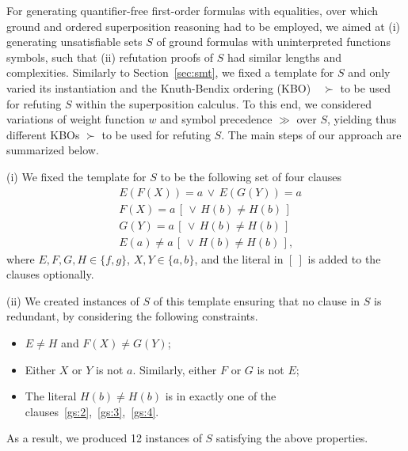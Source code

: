 For generating quantifier-free first-order formulas with equalities,
over which ground and ordered superposition reasoning had to be employed, we
aimed at (i)  generating  unsatisfiable sets $S$ of ground formulas with
uninterpreted functions symbols, such that (ii)  refutation proofs
of $S$ had similar lengths and complexities. Similarly to
Section~\ref{sec:smt}, we fixed a template for $S$  and only varied
its instantiation and
the Knuth-Bendix ordering (KBO)~\cite{Knuth1970}~$\succ$ to be used for refuting  $S$
within the superposition calculus. To this end, we considered
variations of weight function $w$ and symbol precedence $\gg$ over $S$,
yielding thus different KBOs $\succ$ to be used for refuting $S$.
The main steps of our approach are summarized below.\smallskip

\noindent(i) We fixed the template for $S$ to be the following set of four clauses
\begin{align}
  &E(F(X)) = a \,\lor\, E(G(Y)) = a \label{gs:1} \\
  &F(X) = a \,[\, \lor\, H(b) \not= H(b) \,] \label{gs:2} \\
  &G(Y) = a \,[\, \lor\, H(b) \not= H(b) \,] \label{gs:3} \\
  &E(a) \not= a \,[\, \lor\, H(b) \not= H(b) \,] \label{gs:4},
\end{align}
where $E, F, G, H \in \{f, g\}$, $X, Y \in \{a, b\}$, and the literal
in $[~]$ is added to the clauses optionally.\smallskip


\noindent(ii)
We created
instances of $S$ of this template ensuring that no clause in $S$ is
redundant, by considering the following constraints.
\begin{itemize}
  \item $E \not = H$ and $F(X) \not = G(Y)$;
  \item Either $X$ or $Y$ is not $a$. Similarly, either $F$ or $G$ is not $E$;
  \item The literal $H(b) \not = H(b)$ is in exactly one of the
    clauses~\eqref{gs:2},~\eqref{gs:3},~\eqref{gs:4}.
\end{itemize}
As a result, we produced 12 instances of $S$ satisfying the above properties.\smallskip
%


